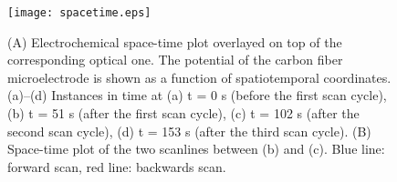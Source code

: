 \documentclass[3p, twocolumn]{elsarticle}
\begin{document}
\def\s{0.5}
\begin{figure}

\centering
{}
\texttt{[image: spacetime.eps]}

\caption{(A) Electrochemical space-time plot overlayed on top of the corresponding optical one.
The potential of the carbon fiber microelectrode is shown as a function of spatiotemporal coordinates.
(a)--(d) Instances in time at (a) t = 0 s (before the first scan cycle), (b) t = 51 s (after the first scan cycle), (c) t = 102 s (after the second scan cycle), (d) t = 153 s (after the third scan cycle).
(B) Space-time plot of the two scanlines between (b) and (c).
Blue line: forward scan, red line: backwards scan.}
\label{fig:spatiotemporal}
\end{figure}
\end{document}
